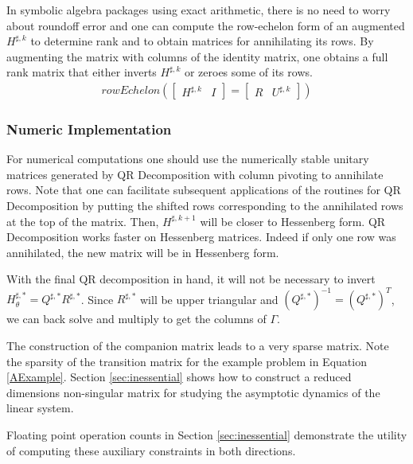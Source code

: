 \documentclass{article}
\begin{document}
{In symbolic algebra packages using exact arithmetic, there is
no need to worry about roundoff error and one can 
compute the row-echelon form of an augmented
$H^{\sharp,k}$ to determine rank and to 
obtain matrices for annihilating its rows\cite[page 119]{NOBLE}.
By augmenting the matrix with columns of the identity matrix, one
obtains a full rank matrix that either inverts $H^{\sharp,k}$ or zeroes
some of its rows.
\begin{gather*}
  rowEchelon(
  \begin{bmatrix}
    H^{\sharp,k}&I
  \end{bmatrix} = 
  \begin{bmatrix}
R    &U^{\sharp,k}
  \end{bmatrix}
)
\end{gather*}


\subsubsection{Numeric Implementation}


For numerical computations one should use the numerically stable unitary matrices generated by
QR Decomposition with column pivoting to annihilate rows.
Note that one can 
facilitate subsequent applications of the routines for QR Decomposition
 by putting the shifted rows corresponding to the annihilated rows
at the top of the  matrix.
Then, $H^{\sharp,k+1}$ will be closer to Hessenberg form. 
QR Decomposition works faster on 
Hessenberg matrices.
Indeed if only one row was annihilated, the new matrix will be 
in Hessenberg form.

With the final QR decomposition in hand,
it will not be necessary to invert
$H^{\sharp,\ast}_\theta= Q^{\sharp,\ast} R^{\sharp,\ast}$. Since 
$R^{\sharp,\ast}$ will be upper triangular and $(Q^{\sharp,\ast})^{-1}=(Q^{\sharp,\ast})^T$, we can back solve and multiply to get the columns of $\Gamma$.





%

The construction of the companion matrix leads to a very sparse
matrix.
Note the sparsity of the transition matrix for the example problem in Equation \ref{AExample}.
Section \ref{sec:inessential}  shows how to 
 construct a reduced dimensions non-singular matrix for studying
the asymptotic dynamics of the linear system.




Floating point operation counts in Section \ref{sec:inessential} demonstrate
the utility of  computing these auxiliary constraints in both directions.
\begin{figure*}[htbp]
  \begin{center}
    \leavevmode
    

\end{center}
\end{figure*}}
\end{document}
